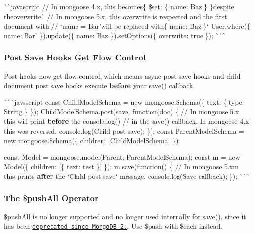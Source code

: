 \`{}\`{}{\ttfamily javascript // In mongoose 4.\+x, this becomes}\{ \$set\+: \{ name\+: \textquotesingle{}Baz\textquotesingle{} \} \}{\ttfamily despite the}overwrite\`{} // In mongoose 5.\+x, this overwrite is respected and the first document with // `name = \textquotesingle{}Bar'{\ttfamily will be replaced with}\{ name\+: \textquotesingle{}Baz\textquotesingle{} \}` User.\+where(\{ name\+: \textquotesingle{}Bar' \}).update(\{ name\+: \textquotesingle{}Baz\textquotesingle{} \}).set\+Options(\{ overwrite\+: true \}); \`{}\`{}\`{}

\subsubsection*{Post Save Hooks Get Flow Control}

Post hooks now get flow control, which means async post save hooks and child document post save hooks execute {\bfseries before} your {\ttfamily save()} callback.

\`{}\`{}\`{}javsscript const Child\+Model\+Schema = new mongoose.\+Schema(\{ text\+: \{ type\+: String \} \}); Child\+Model\+Schema.\+post(\textquotesingle{}save\textquotesingle{}, function(doc) \{ // In mongoose 5.\+x this will print {\bfseries before} the {\ttfamily console.\+log()} // in the {\ttfamily save()} callback. In mongoose 4.\+x this was reversed. console.\+log(\textquotesingle{}Child post save\textquotesingle{}); \}); const Parent\+Model\+Schema = new mongoose.\+Schema(\{ children\+: \mbox{[}Child\+Model\+Schema\mbox{]} \});

const Model = mongoose.\+model(\textquotesingle{}Parent\textquotesingle{}, Parent\+Model\+Schema); const m = new Model(\{ children\+: \mbox{[}\{ text\+: \textquotesingle{}test\textquotesingle{} \}\mbox{]} \}); m.\+save(function() \{ // In mongoose 5.\+xm this prints {\bfseries after} the \char`\"{}\+Child post save\char`\"{} message. console.\+log(\textquotesingle{}Save callback\textquotesingle{}); \}); \`{}\`{}\`{}

\subsubsection*{The {\ttfamily \$push\+All} Operator}

{\ttfamily \$push\+All} is no longer supported and no longer used internally for {\ttfamily save()}, since it has been \href{https://docs.mongodb.com/manual/reference/operator/update/pushAll/}{\tt deprecated since Mongo\+DB 2.}. Use {\ttfamily \$push} with {\ttfamily \$each} instead.

